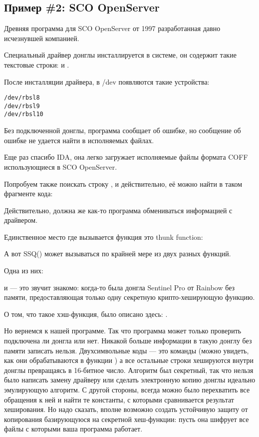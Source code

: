 \subsection{Пример \#2: SCO OpenServer}

\label{examples_SCO}
Древняя программа для SCO OpenServer от 1997 
разработанная давно исчезнувшей компанией.

Специальный драйвер донглы инсталлируется в системе, он содержит такие текстовые строки:
 и .

После инсталляции драйвера, в /dev появляются такие устройства:

\begin{lstlisting}
/dev/rbsl8
/dev/rbsl9
/dev/rbsl10
\end{lstlisting}

Без подключенной донглы, программа сообщает об ошибке, но сообщение об ошибке не удается
найти в исполняемых файлах.

Еще раз спасибо \ac{IDA}, она легко загружает исполняемые файлы формата COFF использующиеся в SCO OpenServer.

Попробуем также поискать строку , и действительно, её можно найти в таком фрагменте кода:



Действительно, должна же как-то программа обмениваться информацией с драйвером.

Единственное место где вызывается функция 
это \gls{thunk function}:



А вот SSQ() может вызываться по крайней мере из двух разных функций.

Одна из них:



 и  --- это звучит знакомо: когда-то была донгла
 Sentinel Pro от Rainbow без памяти,
предоставляющая только одну секретную крипто-хеширующую функцию.

О том, что такое хэш-функция, было описано здесь: .

Но вернемся к нашей программе.
Так что программа может только проверить подключена ли донгла или нет.
Никакой больше информации в такую донглу без памяти записать нельзя.
Двухсимвольные коды --- это команды
(можно увидеть, как они обрабатываются в функции 
) 
а все остальные строки хешируются внутри донглы превращаясь в 16-битное число.
Алгоритм был секретный, так что нельзя было написать замену драйверу или сделать
электронную копию донглы идеально эмулирующую алгоритм.
С другой стороны, всегда можно было перехватить все обращения к ней и найти те константы, с которыми
сравнивается результат хеширования.
Но надо сказать, вполне возможно создать устойчивую защиту от копирования базирующуюся
на секретной хеш-функции: пусть она шифрует все файлы с которыми ваша программа работает.

